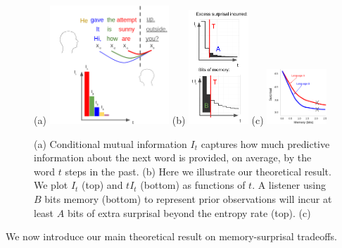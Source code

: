\begin{figure}
	(a)
\includegraphics[width=0.4\textwidth]{figures-gdrive/mi-distance.png}
	(b)
\includegraphics[width=0.2\textwidth]{figures-gdrive/theorem.png}
	(c)
\includegraphics[width=0.2\textwidth]{figures-gdrive/tradeoff.png}
	\caption{
		(a) Conditional mutual information $I_t$ captures how much predictive information about the next word is provided, on average, by the word $t$ steps in the past.
		(b) Here we illustrate our theoretical result. We plot $I_t$ (top) and $tI_t$ (bottom) as functions of $t$. A listener using $B$ bits memory (bottom) to represent prior observations will incur at least $A$ bits of extra surprisal beyond the entropy rate (top). 
		(c)  
}\label{fig:theorem}
\end{figure}





We now introduce our main theoretical result on memory-surprisal tradeoffs.





